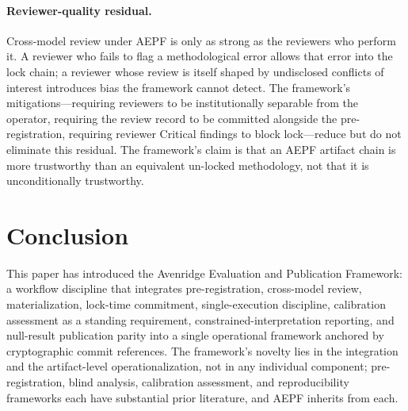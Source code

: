 \documentclass[11pt]{article}
\begin{document}
\paragraph{Reviewer-quality residual.}
Cross-model review under AEPF is only as strong as the reviewers
who perform it. A reviewer who fails to flag a methodological
error allows that error into the lock chain; a reviewer whose
review is itself shaped by undisclosed conflicts of interest
introduces bias the framework cannot detect. The framework's
mitigations---requiring reviewers to be institutionally separable
from the operator, requiring the review record to be committed
alongside the pre-registration, requiring reviewer Critical
findings to block lock---reduce but do not eliminate this residual.
The framework's claim is that an AEPF artifact chain is more
trustworthy than an equivalent un-locked methodology, not that
it is unconditionally trustworthy.

\section{Conclusion}
\label{sec:conclusion}

This paper has introduced the Avenridge Evaluation and Publication
Framework: a workflow discipline that integrates pre-registration,
cross-model review, materialization, lock-time commitment,
single-execution discipline, calibration assessment as a standing
requirement, constrained-interpretation reporting, and null-result
publication parity into a single operational framework anchored by
cryptographic commit references. The framework's novelty lies in the
integration and the artifact-level operationalization, not in any
individual component; pre-registration, blind analysis, calibration
assessment, and reproducibility frameworks each have substantial prior
literature, and AEPF inherits from each.
\end{document}
